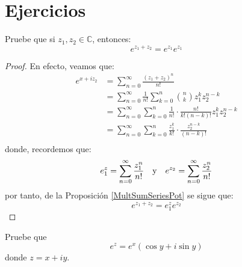 \documentclass[12pt]{report}
\theoremstyle{largebreak}
\begin{document}
    \section{Ejercicios}

    \begin{excer}
        Pruebe que si $z_1,z_2\in\mathbb{C}$, entonces:
        \begin{equation*}
            e^{z_1+z_2}=e^{ z_1}e^{ z_1}
        \end{equation*}
    \end{excer}

    \begin{proof}
        En efecto, veamos que:
        \begin{equation*}
            \begin{split}
                e^{ x+iz_2}&=\sum_{ n=0}^\infty\frac{(z_1+z_2)^n}{n!}\\
                &=\sum_{ n=0}^\infty\frac{1}{n!}\sum_{ k=0}^n\binom{n}{k}z_1^kz_2^{ n-k}\\
                &=\sum_{ n=0}^\infty\sum_{ k=0}^n\frac{1}{n!}\cdot\frac{n!}{k!(n-k)!}z_1^kz_2^{ n-k}\\
                &=\sum_{ n=0}^\infty\sum_{ k=0}^n\frac{z_1^k}{k!}\cdot\frac{z_2^{n-k}}{(n-k)!}\\
            \end{split}
        \end{equation*}
        donde, recordemos que:
        \begin{equation*}
            e^z_1=\sum_{ n=0}^\infty\frac{z_1^n}{n!}\quad\textup{y}\quad e^ {z_2}=\sum_{ n=0}^\infty\frac{z_2^n}{n!}
        \end{equation*}
        por tanto, de la Proposición \ref{MultSumSeriesPot} se sigue que:
        \begin{equation*}
            e^{ z_1+z_2}=e^z_1e^{ z_2}
        \end{equation*}
    \end{proof}

    \begin{excer}
        Pruebe que
        \begin{equation*}
            e^z=e^x(\cos y+i\sin y)
        \end{equation*}
        donde $z=x+iy$.
    \end{excer}
\end{document}
